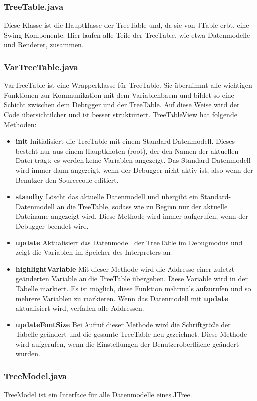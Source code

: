 \subsubsection*{TreeTable.java}
Diese Klasse ist die Hauptklasse der TreeTable und, da sie von JTable erbt, eine Swing-Komponente. Hier laufen alle Teile der TreeTable, wie etwa Datenmodelle und Renderer, zusammen.

\subsubsection*{VarTreeTable.java}
VarTreeTable ist eine Wrapperklasse für TreeTable. Sie übernimmt alle wichtigen Funktionen zur Kommunikation mit dem Variablenbaum und bildet so eine Schicht zwischen dem Debugger und der TreeTable. Auf diese Weise wird der Code übersichtilcher und ist besser strukturiert.
TreeTableView hat folgende Methoden:
\begin{itemize}
\item \textbf{init} Initialisiert die TreeTable mit einem Standard-Datenmodell. Dieses besteht nur aus einem Hauptknoten (root), der den Namen der aktuellen Datei trägt; es werden keine Variablen angezeigt. Das Standard-Datenmodell wird immer dann angezeigt, wenn der Debugger nicht aktiv ist, also wenn der Benutzer den Sourcecode editiert.
\item \textbf{standby} Löscht das aktuelle Datenmodell und übergibt ein Standard-Datenmodell an die TreeTable, sodass wie zu Beginn nur der aktuelle Dateiname angezeigt wird. Diese Methode wird immer aufgerufen, wenn der Debugger beendet wird.
\item \textbf{update} Aktualisiert das Datenmodell der TreeTable im Debugmodus und zeigt die Variablen im Speicher des Interpreters an.
\item \textbf{highlightVariable} Mit dieser Methode wird die Addresse einer zuletzt geänderten Variable an die TreeTable übergeben. Diese Variable wird in der Tabelle markiert. Es ist möglich, diese Funktion mehrmals aufzurufen und so mehrere Variablen zu markieren. Wenn das Datenmodell mit \textbf{update} aktualisiert wird, verfallen alle Addressen.
\item \textbf{updateFontSize} Bei Aufruf dieser Methode wird die Schriftgröße der Tabelle geändert und die gesamte TreeTable neu gezeichnet. Diese Methode wird aufgerufen, wenn die Einstellungen der Benutzeroberfläche geändert wurden.
\end{itemize}

\subsubsection*{TreeModel.java}
TreeModel ist ein Interface für alle Datenmodelle eines JTree.

